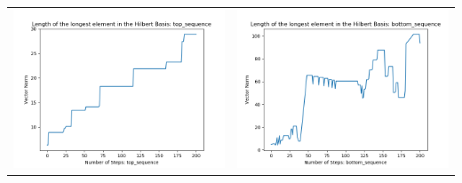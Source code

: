 \documentclass[10pt]{article}
\begin{document}
\begin{tabular}{c|c}
\begin{minipage}{.4\textwidth}
\includegraphics[width=\textwidth]{"DATA/5d/6 generators 2 bound E/top_sequence LENGTH"}
\end{minipage} &
\begin{minipage}{.4\textwidth}
\includegraphics[width=\textwidth]{"DATA/5d/6 generators 2 bound E bottomup/bottom_sequence LENGTH"}
\end{minipage}
\end{tabular}
\end{document}
